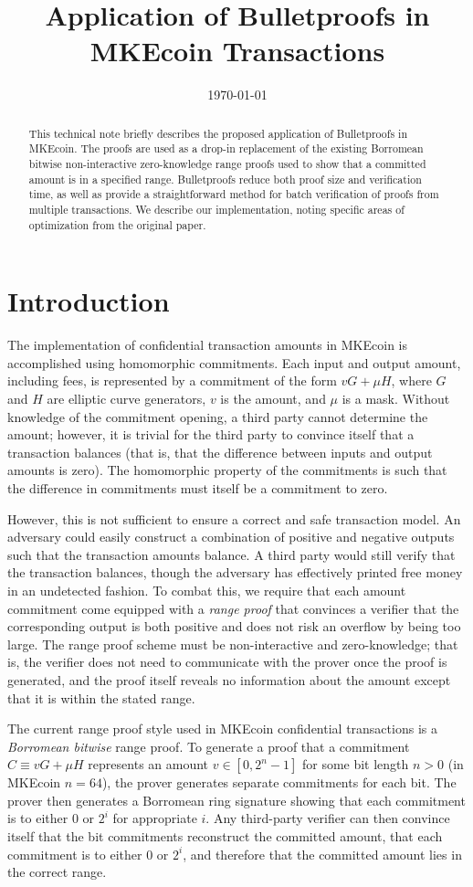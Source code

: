 \documentclass{mrl}
\title{Application of Bulletproofs in MKEcoin Transactions}
\date{\today}
\begin{document}
\begin{abstract}
This technical note briefly describes the proposed application of Bulletproofs \cite{bp} in MKEcoin. The proofs are used as a drop-in replacement of the existing Borromean bitwise non-interactive zero-knowledge range proofs used to show that a committed amount is in a specified range. Bulletproofs reduce both proof size and verification time, as well as provide a straightforward method for batch verification of proofs from multiple transactions. We describe our implementation, noting specific areas of optimization from the original paper.
\end{abstract}

\section{Introduction}
The implementation of confidential transaction amounts in MKEcoin is accomplished using homomorphic commitments. Each input and output amount, including fees, is represented by a commitment of the form $vG + \mu H$, where $G$ and $H$ are elliptic curve generators, $v$ is the amount, and $\mu$ is a mask. Without knowledge of the commitment opening, a third party cannot determine the amount; however, it is trivial for the third party to convince itself that a transaction balances (that is, that the difference between inputs and output amounts is zero). The homomorphic property of the commitments is such that the difference in commitments must itself be a commitment to zero.

However, this is not sufficient to ensure a correct and safe transaction model. An adversary could easily construct a combination of positive and negative outputs such that the transaction amounts balance. A third party would still verify that the transaction balances, though the adversary has effectively printed free money in an undetected fashion. To combat this, we require that each amount commitment come equipped with a \textit{range proof} that convinces a verifier that the corresponding output is both positive and does not risk an overflow by being too large. The range proof scheme must be non-interactive and zero-knowledge; that is, the verifier does not need to communicate with the prover once the proof is generated, and the proof itself reveals no information about the amount except that it is within the stated range.

The current range proof style used in MKEcoin confidential transactions is a \textit{Borromean bitwise} range proof. To generate a proof that a commitment $C \equiv vG + \mu H$ represents an amount $v \in [0,2^n-1]$ for some bit length $n > 0$ (in MKEcoin $n = 64$), the prover generates separate commitments for each bit. The prover then generates a Borromean ring signature showing that each commitment is to either $0$ or $2^i$ for appropriate $i$. Any third-party verifier can then convince itself that the bit commitments reconstruct the committed amount, that each commitment is to either $0$ or $2^i$, and therefore that the committed amount lies in the correct range.
\end{document}
